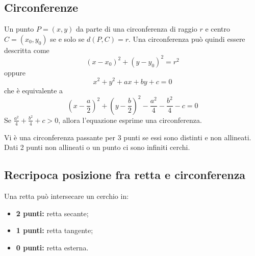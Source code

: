 \documentclass[a4paper]{article}
\begin{document}

\pagebreak

\subsection{Circonferenze}


Un punto \(P=(x,y)\) da parte di una circonferenza di raggio \(r\) e centro \(C=(x_0,y_0)\)
se e solo se \(d(P, C) = r\).
Una circonferenza può quindi essere descritta come
\[
    {(x-x_0)}^2 + {(y-y_0)}^2 = r^2
\]
oppure
\[
    x^2 + y^2 + ax + by + c = 0
\]
che è equivalente a
\[
    {\left(x-\frac{a}{2}\right)}^2 + {\left(y-\frac{b}{2}\right)}^2 - \frac{a^2}{4} - \frac{b^2}{4} - c = 0
\]
Se \(\frac{a^2}{4} + \frac{b^2}{4} + c > 0\), allora l'equazione esprime una circonferenza.

Vi è una circonferenza passante per 3 punti se essi sono distinti e non allineati.
Dati 2 punti non allineati o un punto ci sono infiniti cerchi.


\subsection{Recripoca posizione fra retta e circonferenza}

Una retta può intersecare un cerchio in:
\begin{itemize}
    \item \textbf{2 punti:} retta secante;
    \item \textbf{1 punti:} retta tangente;
    \item \textbf{0 punti:} retta esterna.
\end{itemize}
\end{document}
